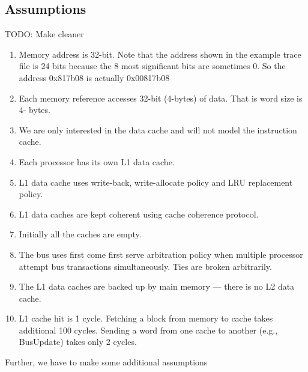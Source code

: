 

\subsection{Assumptions}


TODO: Make cleaner 
\begin{enumerate}
    \item Memory address is 32-bit. Note that the address shown in the example trace file is 24 
bits because the 8 most significant bits are sometimes 0. So the address 0x817b08 is 
actually 0x00817b08 
    \item Each memory reference accesses 32-bit (4-bytes) of data. That is word size is 4-
bytes. 
    \item We are only interested in the data cache and will not model the instruction cache. 
    \item Each processor has its own L1 data cache. 
    \item L1 data cache uses write-back, write-allocate policy and LRU replacement policy. 
    \item L1 data caches are kept coherent using cache coherence protocol. 
    \item Initially all the caches are empty. 
    \item The bus uses first come first serve arbitration policy when multiple processor 
attempt bus transactions simultaneously. Ties are broken arbitrarily.  
    \item The L1 data caches are backed up by main memory --- there is no L2 data cache. 
    \item L1 cache hit is 1 cycle. Fetching a block from memory to cache takes additional 100 
cycles. Sending a word from one cache to another (e.g., BusUpdate) takes only 2 cycles. 
\end{enumerate}

Further, we have to make some additional assumptions

